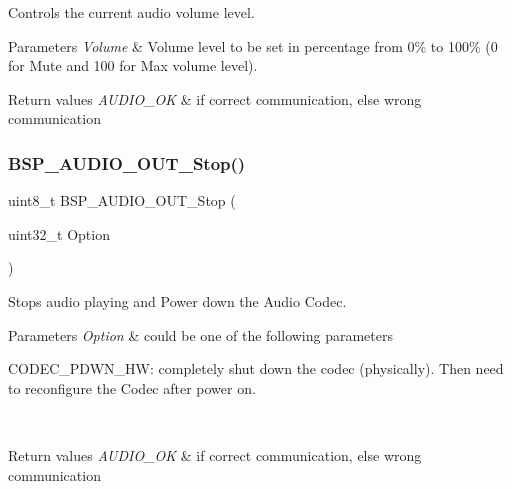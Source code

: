 Controls the current audio volume level. 


\begin{DoxyParams}{Parameters}
{\em Volume} & Volume level to be set in percentage from 0\% to 100\% (0 for Mute and 100 for Max volume level). \\
\hline
\end{DoxyParams}

\begin{DoxyRetVals}{Return values}
{\em A\+U\+D\+I\+O\+\_\+\+OK} & if correct communication, else wrong communication \\
\hline
\end{DoxyRetVals}
\mbox{\label{group___s_t_m32_f4___d_i_s_c_o_v_e_r_y___a_u_d_i_o___o_u_t___exported___functions_gad1a2df4f21ae348be27cecff63dfca1c}} 
\subsubsection{\texorpdfstring{B\+S\+P\+\_\+\+A\+U\+D\+I\+O\+\_\+\+O\+U\+T\+\_\+\+Stop()}{BSP\_AUDIO\_OUT\_Stop()}}
{\footnotesize\ttfamily uint8\+\_\+t B\+S\+P\+\_\+\+A\+U\+D\+I\+O\+\_\+\+O\+U\+T\+\_\+\+Stop (\begin{DoxyParamCaption}\item[{uint32\+\_\+t}]{Option }\end{DoxyParamCaption})}



Stops audio playing and Power down the Audio Codec. 


\begin{DoxyParams}{Parameters}
{\em Option} & could be one of the following parameters
\begin{DoxyItemize}
\item C\+O\+D\+E\+C\+\_\+\+P\+D\+W\+N\+\_\+\+HW\+: completely shut down the codec (physically). Then need to reconfigure the Codec after power on. ~\newline

\end{DoxyItemize}\\
\hline
\end{DoxyParams}

\begin{DoxyRetVals}{Return values}
{\em A\+U\+D\+I\+O\+\_\+\+OK} & if correct communication, else wrong communication \\
\hline
\end{DoxyRetVals}
